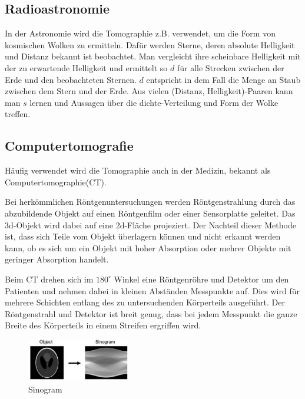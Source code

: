 \documentclass[]{dsadokumentation}
\begin{document}
\subsection{Radioastronomie}

In der Astronomie wird die Tomographie z.B. verwendet, um die Form von kosmischen Wolken zu ermitteln. Dafür werden Sterne, deren absolute Helligkeit und Distanz bekannt ist beobachtet. Man vergleicht ihre scheinbare Helligkeit mit der zu erwartende Helligkeit und ermittelt so $d$ für alle Strecken zwischen der Erde und den beobachteten Sternen. $d$ entspricht in dem Fall die Menge an Staub zwischen dem Stern und der Erde. Aus vielen (Distanz, Helligkeit)-Paaren kann man $s$ lernen und Aussagen über die dichte-Verteilung und Form der Wolke treffen.

\subsection{Computertomografie}

Häufig verwendet wird die Tomographie auch in der Medizin, bekannt als Computertomographie(CT).

Bei herkömmlichen Röntgenuntersuchungen werden Röntgenstrahlung durch das abzubildende Objekt auf einen Röntgenfilm oder einer Sensorplatte geleitet. Das 3d-Objekt wird dabei auf eine 2d-Fläche projeziert. Der Nachteil dieser Methode ist, dass sich Teile vom Objekt überlagern können und nicht erkannt werden kann, ob es sich um ein Objekt mit hoher Absorption oder mehrer Objekte mit geringer Absorption handelt.

Beim CT drehen sich im $180^\circ$ Winkel eine Röntgenröhre und Detektor um den Patienten und nehmen dabei in kleinen Abständen Messpunkte auf. Dies wird für mehrere Schichten entlang des zu untersuchenden Körperteils ausgeführt. Der Röntgenstrahl und Detektor ist breit genug, dass bei jedem Messpunkt die ganze Breite des Körperteils in einem Streifen ergriffen wird.

\begin{figure}
 \includegraphics[width=0.4\textwidth]{k4.2/backprojektion.png}
 \caption{Sinogram}
 \label{k4.2.tomo.ct.bp}
\end{figure}
\end{document}
